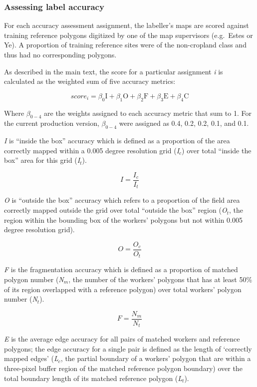 \documentclass[
  11pt,
  a4paper]{article}
\begin{document}
\hypertarget{assessing-label-accuracy}{%
\subsubsection{Assessing label
accuracy}\label{assessing-label-accuracy}}

For each accuracy assessment assignment, the labeller's maps are scored
against training reference polygons digitized by one of the map
supervisors (e.g.~Estes or Ye). A proportion of training reference sites
were of the non-cropland class and thus had no corresponding polygons.

As described in the main text, the score for a particular assignment
\emph{i} is calculated as the weighted sum of five accuracy metrics:

\[ score_i=\beta_0\mathrm{I}+\beta_1\mathrm{O}+\beta_2\mathrm{F}+\beta_3\mathrm{E}+\beta_4\mathrm{C}\]

Where \(\beta_{0-4}\) are the weights assigned to each accuracy metric
that sum to 1. For the current production version, \(\beta_{0-4}\) were
assigned as 0.4, 0.2, 0.2, 0.1, and 0.1.

\emph{I} is ``inside the box'' accuracy which is defined as a proportion
of the area correctly mapped within a 0.005 degree resolution grid
(\emph{I\(_c\)}) over total ``inside the box'' area for this grid
(\emph{I\(_t\)}).

\[ I=\frac{I_c}{I_t}\]

\emph{O} is ``outside the box'' accuracy which refers to a proportion of
the field area correctly mapped outside the grid over total ``outside
the box'' region (\emph{O\(_t\)}, the region within the bounding box of
the workers' polygons but not within 0.005 degree resolution grid).

\[ O=\frac{O_c}{O_t}\]

\emph{F} is the fragmentation accuracy which is defined as a proportion
of matched polygon number (\emph{N\(_m\)}, the number of the workers'
polygons that has at least 50\% of its region overlapped with a
reference polygon) over total workers' polygon number (\emph{N\(_t\)}).

\[ F=\frac{N_m}{N_t}\]

\emph{E} is the average edge accuracy for all pairs of matched workers
and reference polygons; the edge accuracy for a single pair is defined
as the length of `correctly mapped edges' (\emph{L\(_c\)}, the partial
boundary of a workers' polygon that are within a three-pixel buffer
region of the matched reference polygon boundary) over the total
boundary length of its matched reference polygon (\emph{L\(_t\)}).
\end{document}
